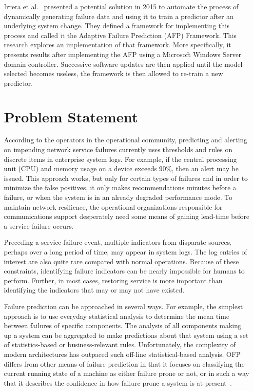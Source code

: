 Irrera et al.~\cite{irrera2015} presented a potential solution in 2015 to
automate the process of dynamically generating failure data and using it to
train a predictor after an underlying system change.  They defined a framework
for implementing this process and called it the Adaptive Failure Prediction
(AFP) Framework.  This research explores an implementation of that framework.
More specifically, it presents results after implementing the AFP using a
Microsoft Windows Server domain controller.  Successive software updates are
then applied until the model selected becomes useless, the framework is then
allowed to re-train a new predictor.

\section{Problem Statement}
According to the operators in the operational community, predicting and
alerting on impending network service failures currently uses thresholds and
rules on discrete items in enterprise system logs.  For example, if the central
processing unit (CPU) and memory usage on a device exceeds 90\%, then an alert
may be issued.  This approach works, but only for certain types of failures and
in order to minimize the false positives, it only makes recommendations minutes
before a failure, or when the system is in an already degraded performance
mode.  To maintain network resilience, the operational organizations
responsible for communications support desperately need some means of gaining
lead-time before a service failure occurs.  

Preceding a service failure event, multiple indicators from disparate
sources, perhaps over a long period of time, may appear in system logs.  The
log entries of interest are also quite rare compared with normal operations.
Because of these constraints, identifying failure indicators can be nearly
impossible for humans to perform.  Further, in most cases, restoring service is
more important than identifying the indicators that may or may not have
existed.  

Failure prediction can be approached in several ways. For example, the simplest
approach is to use everyday statistical analysis to determine the mean time
between failures of specific components. The analysis of all components making
up a system can be aggregated to make predictions about that system using a set
of statistics-based or business-relevant rules.  Unfortunately, the complexity
of modern architectures has outpaced such off-line statistical-based analysis.
OFP differs from other means of failure prediction in that it focuses on
classifying the current running state of a machine as either failure prone or
not, or in such a way that it describes the confidence in how failure prone a
system is at present~\cite{salfnerSurvey}.

